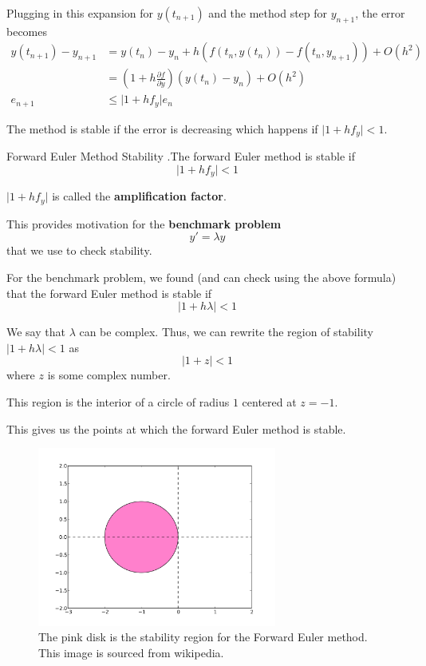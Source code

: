 \documentclass[12pt,letterpaper]{article}
\begin{document}
Plugging in this expansion for $y(t_{n+1})$ and the method step for $y_{n+1}$, the error becomes
\begin{align}
	y(t_{n+1}) - y_{n+1} &= y(t_n) - y_n + h(f(t_n, y(t_n)) - f(t_n, y_{n+1})) + O(h^2) \\
	&= \left( 1 + h \frac{\partial f}{\partial y} \right) (y(t_n) - y_n) + O(h^2) \\
	e_{n+1} &\leq \lvert 1 + h f_y \rvert e_n
\end{align}

The method is stable if the error is decreasing which happens if $\lvert 1 + h f_y \rvert < 1$.
\begin{theo}{Forward Euler Method Stability}
.The forward Euler method is stable if
\begin{equation}
	\lvert 1 + h f_y \rvert < 1
\end{equation}

$\lvert 1 + h f_y \rvert$ is called the \textbf{amplification factor}.
\end{theo}

This provides motivation for the \textbf{benchmark problem}
\begin{equation}
	y' = \lambda y
\end{equation}
that we use to check stability.

For the benchmark problem, we found (and can check using the above formula) that the forward Euler method is stable if
\begin{equation}
	\lvert 1 + h \lambda \rvert < 1
\end{equation}

We say that $\lambda$ can be complex. Thus, we can rewrite the region of stability $\lvert 1 + h\lambda \rvert < 1$ as
\begin{equation}
	\lvert 1 + z \rvert < 1
\end{equation}
where $z$ is some complex number.

This region is the interior of a circle of radius $1$ centered at $z=-1$.

This gives us the points at which the forward Euler method is stable.

\begin{figure}[H]
	\centering
	\includegraphics[width=0.7\textwidth]{FE_stability.png}
	\caption{The pink disk is the stability region for the Forward Euler method. This image is sourced from wikipedia.}
\end{figure}
\end{document}
